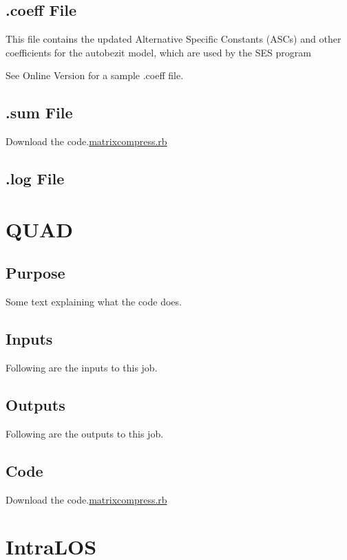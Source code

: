 \documentclass[
  letterpaper,
  DIV=11,
  numbers=noendperiod]{scrreprt}
\begin{document}
\subsection{.coeff File}

This file contains the updated Alternative Specific Constants (ASCs) and
other coefficients for the autobezit model, which are used by the SES
program

See Online Version for a sample .coeff file.

\subsection{.sum File}

Download the code.\href{../../first.rb}{matrixcompress.rb}

\subsection{.log File}

\section{QUAD}\label{quad}

\subsection{Purpose}

Some text explaining what the code does.

\subsection{Inputs}

Following are the inputs to this job.

\subsection{Outputs}

Following are the outputs to this job.

\subsection{Code}

Download the code.\href{../first.rb}{matrixcompress.rb}

\section{IntraLOS}\label{intralos}
\end{document}
